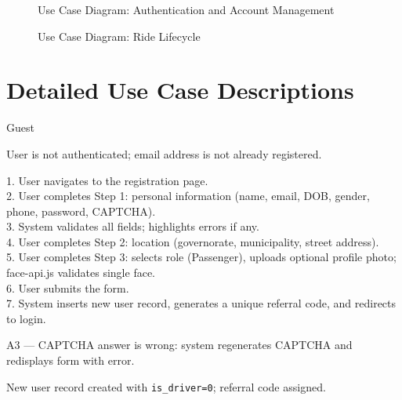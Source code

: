 \documentclass[12pt,a4paper,openright]{report}
\newenvironment{ucbox}[1]{%
  \begin{tcolorbox}[title=#1, colback=fdnavy!3, colframe=fdnavy,
    fonttitle=\bfseries, breakable]%
}{%
  \end{tcolorbox}%
}
\begin{document}
\begin{figure}[H]
\centering
{}
\caption{Use Case Diagram: Authentication and Account Management}
\label{fig:usecase-auth}
\end{figure}

\begin{figure}[H]
\centering
{}
\caption{Use Case Diagram: Ride Lifecycle}
\label{fig:usecase-ride}
\end{figure}

\section{Detailed Use Case Descriptions}

\begin{ucbox}{UC-01: Register as Passenger}
\begin{description}[noitemsep, font=\bfseries, leftmargin=3.5cm]
\item[Actor:] Guest
\item[Pre-condition:] User is not authenticated; email address is not already registered.
\item[Main Flow:]
    1. User navigates to the registration page.\\
    2. User completes Step 1: personal information (name, email, DOB, gender, phone, password, CAPTCHA).\\
    3. System validates all fields; highlights errors if any.\\
    4. User completes Step 2: location (governorate, municipality, street address).\\
    5. User completes Step 3: selects role (Passenger), uploads optional profile photo; face-api.js validates single face.\\
    6. User submits the form.\\
    7. System inserts new user record, generates a unique referral code, and redirects to login.
\item[Alternative Flow:] A3 — CAPTCHA answer is wrong: system regenerates CAPTCHA and redisplays form with error.
\item[Post-condition:] New user record created with \texttt{is\_driver=0}; referral code assigned.
\end{description}
\end{ucbox}
\end{document}
